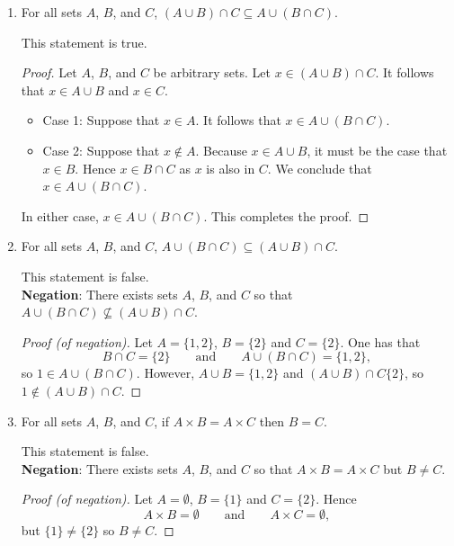 \documentclass[11pt]{article}
\begin{document}
\begin{enumerate}
\item For all sets $A$, $B$, and $C$, $(A\cup B)\cap C\subseteq A\cup(B\cap C)$.
\begin{Solution} This statement is true.
      \begin{proof}
       Let $A$, $B$, and $C$ be arbitrary sets. Let $x\in(A\cup B)\cap C$. It follows that $x\in A\cup B$ and $x\in C$.
        \begin{itemize}
         \item[]Case 1: Suppose that $x\in A$. It follows that $x\in A\cup (B\cap C)$.
         \item[]Case 2: Suppose that $x\notin A$. Because $x\in A\cup B$, it must be the case that $x\in B$. Hence $x\in B\cap C$ as $x$ is also in $C$. We conclude that $x\in A\cup (B\cap C)$.
        \end{itemize}
      In either case, $x\in A\cup (B\cap C)$. This completes the proof.
      \end{proof}
\end{Solution}
 
\item For all sets $A$, $B$, and $C$, $A\cup (B\cap C)\subseteq (A\cup B)\cap C$.
      \begin{Solution}This statement is false.\\
      \textbf{Negation}: There exists sets $A$, $B$, and $C$ so that $A\cup (B\cap C)\not\subseteq (A\cup B)\cap C$.\\\vspace{-20pt}
      \begin{proof}[Proof \textup{(}of negation\textup{)}]
       Let $A=\{1,2\}$, $B=\{2\}$ and $C=\{2\}$. One has that 
       \[
       B\cap C = \{2\}\qquad\text{and}\qquad A\cup (B\cap C)=\{1,2\},
       \]
 so $1\in A\cup (B\cap C)$. However, $A\cup B = \{1,2\}$ and $(A\cup B)\cap C \{2\}$, so $1\not\in (A\cup B)\cap C$.
      \end{proof}
\end{Solution}

\item For all sets $A$, $B$, and $C$, if $A\times B = A\times C$ then $B=C$.\\
      \begin{Solution}This statement is false.\\
      \textbf{Negation}: There exists sets $A$, $B$, and $C$ so that $A\times B=A\times C$ but $B\neq C$.
      \begin{proof}[Proof \textup{(}of negation\textup{)}]
       Let $A=\emptyset$, $B=\{1\}$ and $C=\{2\}$. Hence 
       \[
        A\times B = \emptyset\qquad\text{and}\qquad A\times C = \emptyset,
       \]
 but $\{1\}\neq \{2\}$ so $B\neq C$. 
      \end{proof}
\end{Solution}


\end{enumerate}
\end{document}
